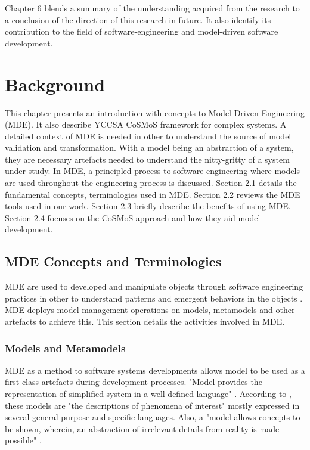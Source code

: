 \documentclass[12pt, a4paper]{report}
\begin{document}
Chapter 6 blends a summary of the understanding acquired from the research to a conclusion of the direction of this research in future. It also identify its contribution to the field of software-engineering and model-driven software development.

\chapter{Background}
This chapter presents an introduction with concepts to Model Driven Engineering (MDE). It also describe YCCSA CoSMoS framework for complex systems. A detailed context of MDE is needed in other to understand the source of model validation and transformation. With a model being an abstraction of a system, they are necessary artefacts needed to understand the nitty-gritty of a system under study. In MDE, a principled process to software engineering where models are used throughout the engineering process is discussed. Section 2.1 details the fundamental concepts, terminologies used in MDE. Section 2.2 reviews the MDE tools used in our work. Section 2.3 briefly describe the benefits of using MDE. Section 2.4 focuses on the CoSMoS approach and how they aid model development.

\section{MDE Concepts and Terminologies}
MDE are used to developed and manipulate objects through software engineering practices in other to understand patterns and emergent behaviors in the objects \cite{Bézivin2005}. MDE deploys model management operations on models, metamodels and other artefacts to achieve this. This section details the activities involved in MDE.

\subsection{Models and Metamodels}
MDE as a method to software systems developments allows model to be used as a first-class artefacts during development processes. "Model provides the representation of simplified system in a well-defined language" \cite{Bezivin:2001:TPD:872023.872565}. According to \cite{DBLP:conf/ecmdafa/2006}, these models are "the descriptions of phenomena of interest" mostly expressed in several general-purpose and specific languages. Also, a "model allows concepts to be shown, wherein, an abstraction of irrelevant details from reality is made possible" \cite{Starfield:1993:MPS:562530}. 
\end{document}
